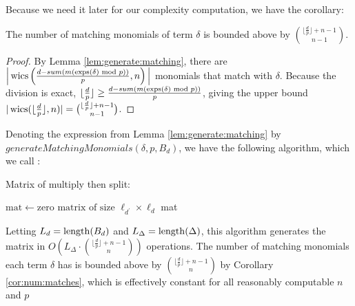 Because we need it later for our complexity computation, we have the corollary:

\begin{cor}
    \label{cor:num:matches}
    The number of matching monomials of term $\delta$ is 
    bounded above by $\binom{\lfloor \frac{d}{p} \rfloor + n - 1}{n - 1}$.
\end{cor}

\begin{proof}
    By Lemma \ref{lem:generate:matching}, there are 
    $\Big |\operatorname{wics} \left(\frac{d - sum(m(\operatorname{exps}(\delta) \text{ mod } p))}{p}, n \right) \Big |$ 
    monomials that match with $\delta$.
    Because the division is exact, 
    $\lfloor \frac{d}{p} \rfloor \geq \frac{d - sum(m(\operatorname{exps}(\delta) \text{ mod } p))}{p}$,
    giving the upper bound 
    $|\operatorname{wics}(\lfloor \frac{d}{p} \rfloor, n)| = \binom{\lfloor \frac{d}{p} \rfloor + n - 1}{n - 1}$.
\end{proof}

Denoting the expression from Lemma \ref{lem:generate:matching} 
by $generateMatchingMonomials(\delta, p, B_d)$, we have
the following algorithm, which we call \wicsalg:

\begin{algorithm}[H]
    \caption{Matrix of multiply then split: \wicsalg}
    $\text{mat} \gets \text{zero matrix of size } \ell_{d^\prime} \times \ell_d $\;
    \Return mat
    \label{alg:matrix:WICS}
\end{algorithm}

Letting $L_{d} = \operatorname{length}(B_d)$ and 
$L_{\Delta} = \operatorname{length}(\Delta)$, this algorithm 
generates the matrix in 
$O \left( L_{\Delta} \cdot \binom{\lfloor \frac{d}{p} \rfloor + n - 1}{n} \right)$ operations.
The number of matching monomials each term $\delta$ 
has is bounded above by $\binom{\lfloor \frac{d}{p} \rfloor + n - 1}{n}$ 
by Corollary \ref{cor:num:matches}, which is 
effectively constant for all reasonably computable $n$ and $p$

